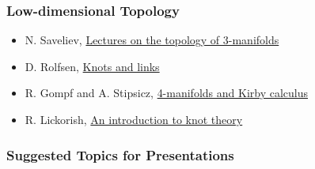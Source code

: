 \hypertarget{low-dimensional-topology}{%
\subsubsection{Low-dimensional
Topology}\label{low-dimensional-topology}}

\begin{itemize}
\tightlist
\item
  \autocite{S} N. Saveliev,
  \href{https://www.degruyter.com/view/title/121170}{Lectures on the
  topology of 3-manifolds}
\item
  \autocite{R} D. Rolfsen,
  \href{https://bookstore.ams.org/chel-346-h/}{Knots and links}
\item
  \autocite{GS} R. Gompf and A. Stipsicz,
  \href{https://bookstore.ams.org/gsm-20}{4-manifolds and Kirby
  calculus}
\item
  \autocite{L} R. Lickorish,
  \href{https://link.springer.com/book/10.1007/978-1-4612-0691-0}{An
  introduction to knot theory}
\end{itemize}

\hypertarget{suggested-topics-for-presentations}{%
\subsubsection{Suggested Topics for
Presentations}\label{suggested-topics-for-presentations}}

